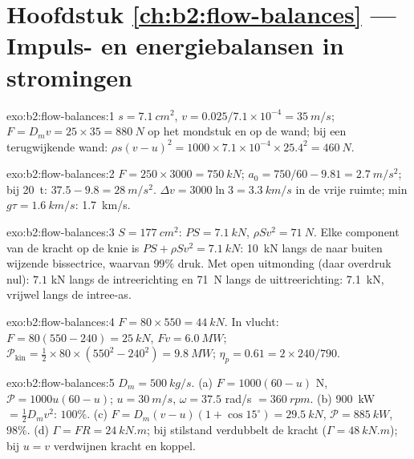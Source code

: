 \section*{Hoofdstuk \ref{ch:b2:flow-balances} --- Impuls- en energiebalansen
in stromingen}

\begin{solution}{exo:b2:flow-balances:1}
$s = \qty{7.1}{cm^2}$, $v = 0.025/7.1 \times 10^{-4} = \qty{35}{m/s}$;
$F = D_mv = 25
\times 35 = \qty{880}{N}$ op het mondstuk en op de wand; bij
een terugwijkende wand:
$\rho s(v -
u)^2 = 1000 \times 7.1 \times 10^{-4} \times 25.4^2 = \qty{460}{N}$.
\end{solution}

\begin{solution}{exo:b2:flow-balances:2}
$F = 250 \times 3000 = \qty{750}{kN}$;
$a_0 = 750/60 - 9.81 = \qty{2.7}{m/s^2}$; bij \qty{20}{t}:
$37.5 - 9.8 = \qty{28}{m/s^2}$. $\Delta v = 3000\ln3 = \qty{3.3}{km/s}$ in
de vrije ruimte; min $g\tau = \qty{1.6}{km/s}$: \qty{1.7}{km/s}.
\end{solution}

\begin{solution}{exo:b2:flow-balances:3}
$S = \qty{177}{cm^2}$: $PS = \qty{7.1}{kN}$, $\rho Sv^2 = \qty{71}{N}$. Elke
component van de kracht op de knie is $PS + \rho Sv^2 = \qty{7.1}{kN}$:
\qty{10}{kN} langs de naar buiten wijzende bissectrice, waarvan $99\%$ druk.
Met open uitmonding (daar overdruk nul): $7.1$ kN langs de intreerichting en
\qty{71}{N} langs de uittreerichting: \qty{7.1}{kN}, vrijwel langs de
intree-as.
\end{solution}

\begin{solution}{exo:b2:flow-balances:4}
$F = 80 \times 550 = \qty{44}{kN}$. In vlucht:
$F = 80(550 - 240) = \qty{25}{kN}$, $Fv =
\qty{6.0}{MW}$;
$\mathcal P_{\text{kin}} = \tfrac12 \times 80 \times (550^2 - 240^2) =
\qty{9.8}{MW}$;
$\eta_p = 0.61 = 2 \times 240/790$.
\end{solution}

\begin{solution}{exo:b2:flow-balances:5}
$D_m = \qty{500}{kg/s}$. (a) $F = 1000(60 - u)$ N,
$\mathcal P = 1000u(60 - u)$; $u =
\qty{30}{m/s}$, $\omega = 37.5$ rad/s
$= \qty{360}{rpm}$. (b) \qty{900}{kW} $=
\tfrac12D_mv^2$: $100\%$. (c)
$F = D_m(v - u)(1 + \cos15^\circ) = \qty{29.5}{kN}$,
$\mathcal P
= \qty{885}{kW}$, $98\%$. (d) $\Gamma = FR = \qty{24}{kN.m}$;
bij stilstand verdubbelt de kracht ($\Gamma = \qty{48}{kN.m}$); bij $u = v$
verdwijnen kracht en koppel.
\end{solution}

